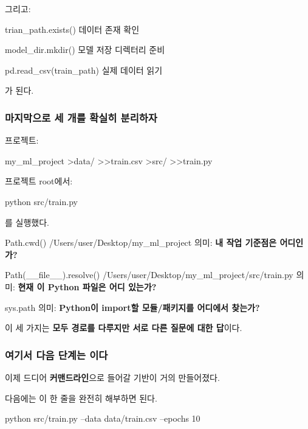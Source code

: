 그리고:

\begin{dhksmry}[centered]
trian_path.exists()
\da
데이터 존재 확인

model_dir.mkdir()
\da
모델 저장 디렉터리 준비

pd.read_csv(train_path)
\da
실제 데이터 읽기
\end{dhksmry}

가 된다.

\subsubsection{마지막으로 세 개를 확실히 분리하자}

프로젝트:

\begin{dhkdir}
my_ml_project
>data/
>>train.csv
>src/
>>train.py
\end{dhkdir}

프로젝트 root에서:

\begin{dhkzsh}
python src/train.py
\end{dhkzsh}

를 실행했다.

\begin{dhknote}
\begin{dhksmry}
Path.cwd()
\ra /Users/user/Desktop/my_ml_project
의미: \textbf{내 작업 기준점은 어디인가?}

Path(__file__).resolve()
\ra /Users/user/Desktop/my_ml_project/src/train.py
의미: \textbf{현재 이 Python 파일은 어디 있는가?}

sys.path
의미: \textbf{Python이 import할 모듈/패키지를 어디에서 찾는가?}
\end{dhksmry}
\end{dhknote}

이 세 가지는 \textbf{모두 경로를 다루지만 서로 다른 질문에 대한 답}이다.

\subsubsection{여기서 다음 단계는 이다}

이제 드디어 \textbf{커맨드라인}으로 들어갈 기반이 거의 만들어졌다.

다음에는 이 한 줄을 완전히 해부하면 된다.

\begin{dhkzsh}
python src/train.py --data data/train.csv --epochs 10
\end{dhkzsh}

